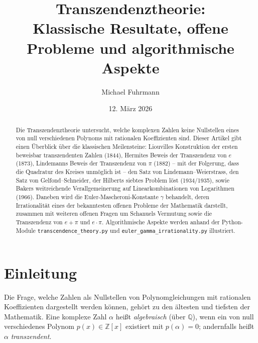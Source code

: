 \documentclass[12pt,a4paper]{amsart}
\theoremstyle{definition}
\begin{document}
\title{Transzendenztheorie:\\
Klassische Resultate, offene Probleme und algorithmische Aspekte}
\author{Michael Fuhrmann}
\address{Specialist Mathematics Project, Build 141}
\date{12. März 2026}

\begin{abstract}
Die Transzendenztheorie untersucht, welche komplexen Zahlen keine Nullstellen
eines von null verschiedenen Polynoms mit rationalen Koeffizienten sind.
Dieser Artikel gibt einen Überblick über die klassischen Meilensteine:
Liouvilles Konstruktion der ersten beweisbar transzendenten Zahlen (1844),
Hermites Beweis der Transzendenz von $e$ (1873), Lindemanns Beweis der
Transzendenz von $\pi$ (1882) -- mit der Folgerung, dass die Quadratur des
Kreises unmöglich ist -- den Satz von Lindemann--Weierstrass, den Satz von
Gelfond--Schneider, der Hilberts siebtes Problem löst (1934/1935), sowie
Bakers weitreichende Verallgemeinerung auf Linearkombinationen von Logarithmen
(1966). Daneben wird die Euler-Mascheroni-Konstante $\gamma$ behandelt,
deren Irrationalität eines der bekanntesten offenen Probleme der Mathematik
darstellt, zusammen mit weiteren offenen Fragen um Schanuels Vermutung sowie
die Transzendenz von $e + \pi$ und $e \cdot \pi$. Algorithmische Aspekte
werden anhand der Python-Module \texttt{transcendence\_theory.py} und
\texttt{euler\_gamma\_irrationality.py} illustriert.
\end{abstract}

\maketitle

\tableofcontents

\section{Einleitung}

Die Frage, welche Zahlen als Nullstellen von Polynomgleichungen mit rationalen
Koeffizienten dargestellt werden können, gehört zu den ältesten und tiefsten
der Mathematik. Eine komplexe Zahl $\alpha$ heißt \emph{algebraisch} (über
$\mathbb{Q}$), wenn ein von null verschiedenes Polynom $p(x) \in \mathbb{Z}[x]$
existiert mit $p(\alpha) = 0$; andernfalls heißt $\alpha$ \emph{transzendent}.
\end{document}
